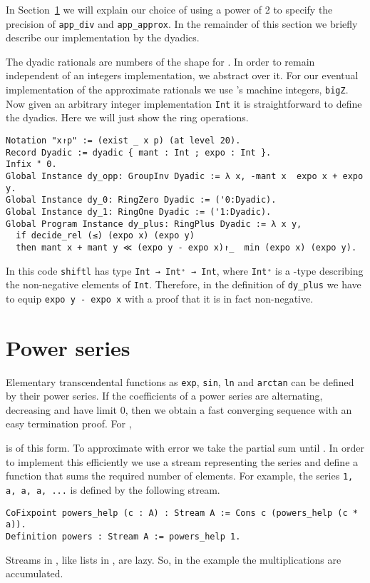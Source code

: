 \documentclass[a4paper,10pt,runningheads]{llncs}
\begin{document}
In Section~\ref{section:series} we will explain our choice of using a power of 2 to specify the precision of \lstinline|app_div| and \lstinline|app_approx|. In the remainder of this section we briefly describe our implementation by the dyadics.

The dyadic rationals are numbers of the shape  for . In order to remain independent of an integers implementation, we abstract over it. For our eventual implementation of the approximate rationals we use \Coq's machine integers, \lstinline|bigZ|. Now given an arbitrary integer implementation \lstinline|Int| it is straightforward to define the dyadics. Here we will just show the ring operations.
\begin{lstlisting}[mathescape=false,breaklines=false]
Notation "x↾p" := (exist _ x p) (at level 20).
Record Dyadic := dyadic { mant : Int ; expo : Int }.
Infix " 0.
Global Instance dy_opp: GroupInv Dyadic := λ x, -mant x  expo x + expo y.
Global Instance dy_0: RingZero Dyadic := ('0:Dyadic).
Global Instance dy_1: RingOne Dyadic := ('1:Dyadic).
Global Program Instance dy_plus: RingPlus Dyadic := λ x y, 
  if decide_rel (≤) (expo x) (expo y)
  then mant x + mant y ≪ (expo y - expo x)↾_  min (expo x) (expo y).
\end{lstlisting}
In this code \lstinline|shiftl| has type \lstinline|Int → Int⁺ → Int|, where \lstinline|Int⁺| is a -type describing the non-negative elements of \lstinline|Int|. Therefore, in the definition of \lstinline|dy_plus| we have to equip \lstinline|expo y - expo x| with a proof that it is in fact non-negative.

\section{Power series}\label{section:series}
Elementary transcendental functions as \lstinline|exp|, \lstinline|sin|, \lstinline|ln| and \lstinline|arctan| can be defined by their power series. If the coefficients of a power series are alternating, decreasing and have limit 0, then we obtain a fast converging sequence with an easy termination proof. For ,

is of this form. To approximate  with error  we take the partial sum until .
In order to implement this efficiently we use a stream representing the series and define a function that sums the required number of elements. For example, the series \lstinline|1, a, a, a, ...| is defined by the following stream.
\begin{lstlisting}
CoFixpoint powers_help (c : A) : Stream A := Cons c (powers_help (c * a)).
Definition powers : Stream A := powers_help 1.
\end{lstlisting}
Streams in \Coq, like lists in \Haskell, are lazy. So, in the example the multiplications are accumulated.
\end{document}
